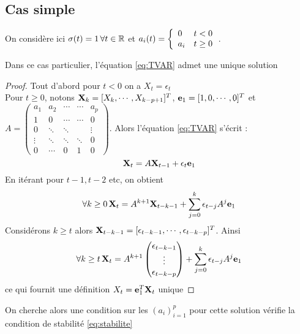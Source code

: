 \documentclass[a4paper,french]{article}
\begin{document}
\subsection{Cas simple}
On considère ici $\sigma(t)=1 \, \forall t\in \mathbb{R}$ et $a_i(t) = { \left\lbrace \begin{array}{ll} 
0 & t<0 \\
a_i & t \geq 0 \\ 
 \end{array} \right. } $. 
\begin{Prop}\label{prop:cas_simple_unicite}
Dans ce cas particulier, l'équation \eqref{eq:TVAR} admet une unique solution
\end{Prop} 
\begin{proof}
Tout d'abord pour $t < 0$ on a $X_t = \epsilon_t$ \\
Pour $t \geq 0$, notons $\mathbf{X}_k = [ X_k, \cdots , X_{k-p+1} ]^T$, $\mathbf{e}_1 = [1,0, \cdots, 0]^T$ et $A = \begin{pmatrix}
a_1 & a_2 & \cdots & \cdots & a_p \\
1 & 0 & \cdots & \cdots & 0 \\
0 & \ddots & \ddots & & \vdots \\
\vdots & \ddots & \ddots & \ddots & 0 \\
0 & \cdots & 0 & 1 & 0
\end{pmatrix}$. Alors l'équation \eqref{eq:TVAR} s'écrit : 
\[ \mathbf{X}_t = A\mathbf{X}_{t-1} + \epsilon_t \mathbf{e}_1 \]
En itérant pour $t-1, t-2$ etc, on obtient 
\[ \forall k\geq 0 \,  \mathbf{X}_t = A^{k+1} \mathbf{X}_{t-k-1} + \sum_{j=0}^k \epsilon_{t-j} A^j \mathbf{e}_1  \]
Considérons $k \geq t$ alors $\mathbf{X}_{t-k-1} = [ \epsilon_{t-k-1}, \cdots , \epsilon_{t-k-p} ]^T$. Ainsi 
\begin{equation}\label{eq:X}
\forall k\geq t \,  \mathbf{X}_t = A^{k+1} \begin{pmatrix}
\epsilon_{t-k-1} \\
\vdots \\
\epsilon_{t-k-p}\\
\end{pmatrix} 
+ \sum_{j=0}^k \epsilon_{t-j} A^j \mathbf{e}_1  
\end{equation}
ce qui fournit une définition $X_t = \mathbf{e}_1^T \mathbf{X}_t$ unique
\end{proof}

On cherche alors une condition sur les $(a_i)_{i=1}^p$ pour cette solution vérifie la condition de stabilité \eqref{eq:stabilite}
\end{document}
